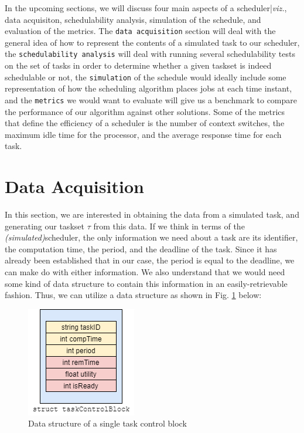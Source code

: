 In the upcoming sections, we will discuss four main aspects of a scheduler|\textit{viz.}, data acquisiton, schedulability analysis, simulation of the schedule, and evaluation of the metrics. The \texttt{data acquisition} section will deal with the general idea of how to represent the contents of a simulated task to our scheduler, the \texttt{schedulability analysis} will deal with running several schedulability tests on the set of tasks in order to determine whether a given taskset is indeed schedulable or not, the \texttt{simulation} of the schedule would ideally include some representation of how the scheduling algorithm places jobs at each time instant, and the \texttt{metrics} we would want to evaluate will give us a benchmark to compare the performance of our algorithm against other solutions. Some of the metrics that define the efficiency of a scheduler is the number of context switches, the maximum idle time for the processor, and the average response time for each task.

\section{Data Acquisition}\label{sec:data-acquisition}

In this section, we are interested in obtaining the data from a simulated task, and generating our taskset $\tau$ from this data. If we think in terms of the \textit{(simulated)}scheduler, the only information we need about a task are its identifier, the computation time, the period, and the deadline of the task. Since it has already been established that in our case, the period is equal to the deadline, we can make do with either information. We also understand that we would need some kind of data structure to contain this information in an easily-retrievable fashion. Thus, we can utilize a data structure as shown in Fig. \ref{fig:tcb} below:

\begin{figure}[h!]
  \centering
  \includegraphics[scale=0.5]{../imgs/single-tcb}
  \caption{Data structure of a single task control block}
  \label{fig:tcb}
\end{figure}

